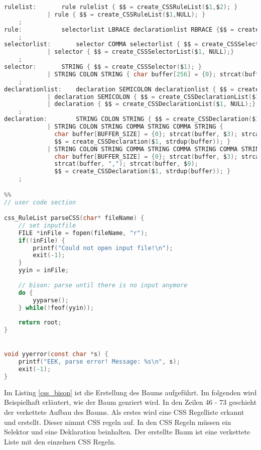 \begin{lstlisting}[label=css_bison,language=C, caption=Baumgenerierung mit Bison]
rulelist:		rule rulelist { $$ = create_CSSRuleList($1,$2); }
			| rule { $$ = create_CSSRuleList($1,NULL); }
	;
rule:			selectorlist LBRACE declarationlist RBRACE {$$ = create_CSSRule($1, $3); }
	;
selectorlist:		selector COMMA selectorlist { $$ = create_CSSSelectorList($1,$3);}
			| selector { $$ = create_CSSSelectorList($1, NULL);}
	;			
selector:		STRING { $$ = create_CSSSelector($1); }
			| STRING COLON STRING { char buffer[256] = {0}; strcat(buffer, $1); strcat(buffer, ":"); strcat(buffer, $3);  $$ = create_CSSSelector(strdup(buffer)); }
	;
declarationlist: 	declaration SEMICOLON declarationlist { $$ = create_CSSDeclarationList($1,$3);}
			| declaration SEMICOLON { $$ = create_CSSDeclarationList($1, NULL);}
			| declaration { $$ = create_CSSDeclarationList($1, NULL);}
	;				
declaration:		STRING COLON STRING { $$ = create_CSSDeclaration($1, $3); }
			| STRING COLON STRING COMMA STRING COMMA STRING { 
			  char buffer[BUFFER_SIZE] = {0}; strcat(buffer, $3); strcat(buffer, ","); strcat(buffer, $5); strcat(buffer, ","); strcat(buffer, $7);
			  $$ = create_CSSDeclaration($1, strdup(buffer)); }
			| STRING COLON STRING COMMA STRING COMMA STRING COMMA STRING { 
			  char buffer[BUFFER_SIZE] = {0}; strcat(buffer, $3); strcat(buffer, ","); strcat(buffer, $5); strcat(buffer, ","); strcat(buffer, $7);
			  strcat(buffer, ","); strcat(buffer, $9); 
			  $$ = create_CSSDeclaration($1, strdup(buffer)); }
	;

%%
// user code section

css_RuleList parseCSS(char* fileName) {
    // set inputfile
    FILE *inFile = fopen(fileName, "r");
    if(!inFile) {
        printf("Could not open input file!\n");
        exit(-1);
    }
    yyin = inFile;
    
    // bison: parse until there is no input anymore
    do {
        yyparse();
    } while(!feof(yyin));
   	
    return root;
}


void yyerror(const char *s) {
    printf("EEK, parse error! Message: %s\n", s);
    exit(-1);
}
\end{lstlisting}

Im Listing \ref{css_bison} ist die Erstellung des Baums aufgeführt. Im folgenden wird Beispielhaft erläutert, wie der Baum genriert wird. In den Zeilen 46 - 73 geschieht der verkettete Aufbau des Baums. Als erstes wird eine CSS Regelliste erkannt und erstellt. Dieser nimmt CSS regeln auf. In den CSS Regeln müssen ein Selektor und eine Deklaration beinhalten. Der erstellte Baum ist eine verkettete Liste mit den einzelnen CSS Regeln.
